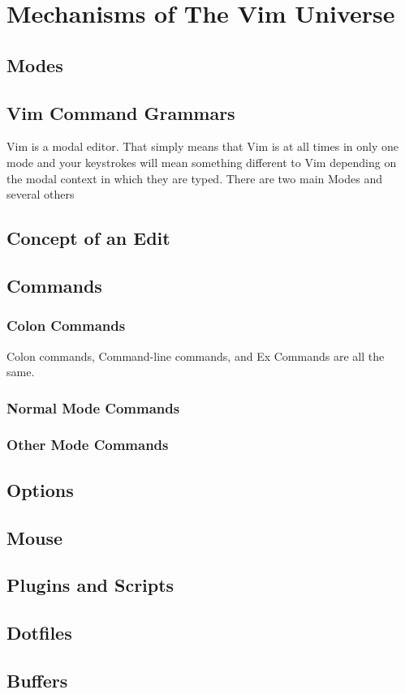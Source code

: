 \documentclass[12pt, oneside]{book}
\begin{document}
\chapter{Mechanisms of The Vim Universe}
\section{Modes}
\section{Vim Command Grammars}
Vim is a modal editor.  That simply means that Vim is at all times in only one mode and your keystrokes will mean something different to Vim depending on the modal context in which they are typed.  There
are two main Modes and several others
\section{Concept of an Edit}
\section{Commands}
  \subsection{Colon Commands}
  Colon commands, Command-line commands, and Ex Commands are all the same.
  \subsection{Normal Mode Commands}
  \subsection{Other Mode Commands}
\section{Options}
\section{Mouse}
\section{Plugins and Scripts}
\section{Dotfiles}
\section{Buffers}
\end{document}
